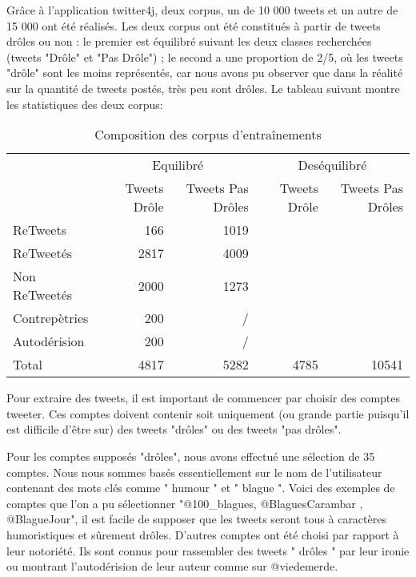 \documentclass[10pt,a4paper,twoside]{article}
\begin{document}
Grâce à l'application twitter4j, deux corpus, un de 10 000 tweets et un autre de 15 000 ont été réalisés. Les deux corpus ont été constitués à partir de tweets drôles ou non : le premier est équilibré suivant les deux classes recherchées (tweets "Drôle" et "Pas Drôle") ; le second a une proportion de 2/5, où les tweets "drôle" sont les moins représentés, car nous avons pu observer que dans la réalité sur la quantité de tweets postés, très peu sont drôles. Le tableau suivant montre les statistiques des deux corpus: 

\begin{table}[!h]
\centering
	\begin{tabular}{lrrrr}
	\toprule
	& \multicolumn{2}{c}{Equilibré}  & \multicolumn{2}{c}{Deséquilibré}\\
	\cmidrule(r){2-3} \cmidrule(r){4-5}

	& Tweets Drôle & Tweets Pas Drôles &  Tweets Drôle & Tweets Pas Drôles \\
	\midrule
	 ReTweets & 166 & 1019 &   & \\
	
	 ReTweetés & 2817 & 4009 & & \\
	
	Non ReTweetés & 2000 & 1273 & &\\
	
	Contrepètries & 200 & / & & \\
	Autodérision & 200 & / & & \\
	 \midrule
	Total & 4817 & 5282 & 4785 &  10541 \\
	\bottomrule
	\end{tabular}
\caption{Composition des corpus d'entraînements}
\end{table}


Pour extraire des tweets, il est important de commencer par choisir des comptes tweeter. Ces comptes doivent contenir soit uniquement (ou grande partie puisqu'il est difficile d'être sur) des tweets "drôles" ou des tweets "pas drôles".

Pour les comptes supposés "drôles", nous avons effectué une sélection de 35 comptes. Nous nous sommes basés essentiellement sur le nom de l'utilisateur contenant des mots clés comme " humour " et " blague ". Voici des exemples de comptes que l'on a pu sélectionner "@100\_blagues, @BlaguesCarambar , @BlagueJour", il est facile de supposer que les tweets seront tous à caractères humoristiques et sûrement drôles. D'autres comptes ont été choisi par rapport à leur notoriété. Ils sont connus pour rassembler des tweets " drôles " par leur ironie ou montrant l'autodérision de leur auteur comme sur @viedemerde.
\end{document}
